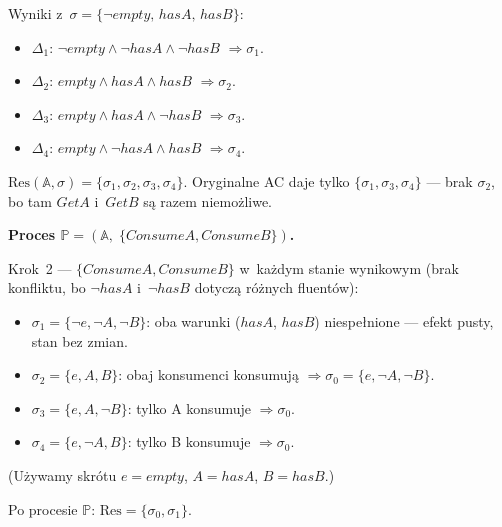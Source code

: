 \documentclass[11pt,a4paper]{article}
\newif\ifshowbib
\newcommand{\bibonly}[1]{\ifshowbib#1\fi}
\renewcommand{\cite}[2][]{\unskip}%
\theoremstyle{definition}
\begin{document}
\noindent Wyniki z~$\sigma = \{\neg\mathit{empty},\, \mathit{hasA},\, \mathit{hasB}\}$:
\begin{itemize}
  \item $\Delta_1$: $\neg\mathit{empty} \land \neg\mathit{hasA} \land \neg\mathit{hasB}$
        $\Rightarrow \sigma_1$.
  \item $\Delta_2$: $\mathit{empty} \land \mathit{hasA} \land \mathit{hasB}$
        $\Rightarrow \sigma_2$.
  \item $\Delta_3$: $\mathit{empty} \land \mathit{hasA} \land \neg\mathit{hasB}$
        $\Rightarrow \sigma_3$.
  \item $\Delta_4$: $\mathit{empty} \land \neg\mathit{hasA} \land \mathit{hasB}$
        $\Rightarrow \sigma_4$.
\end{itemize}

$\mathrm{Res}(\mathbb{A}, \sigma) = \{\sigma_1, \sigma_2, \sigma_3, \sigma_4\}$.
Oryginalne AC\bibonly{~\cite{rw05}} daje tylko $\{\sigma_1, \sigma_3, \sigma_4\}$ --- brak $\sigma_2$,
bo tam $\mathit{GetA}$ i~$\mathit{GetB}$ są razem niemożliwe.

\medskip
\noindent\textbf{Proces $\mathbb{P} = (\mathbb{A},\; \{\mathit{ConsumeA}, \mathit{ConsumeB}\})$.}

Krok~2 --- $\{\mathit{ConsumeA}, \mathit{ConsumeB}\}$ w~każdym stanie
wynikowym (brak konfliktu, bo $\neg\mathit{hasA}$ i~$\neg\mathit{hasB}$
dotyczą różnych fluentów):
\begin{itemize}
  \item $\sigma_1 = \{\neg e, \neg A, \neg B\}$:
        oba warunki ($\mathit{hasA}$, $\mathit{hasB}$) niespełnione
        --- efekt pusty, stan bez zmian.
  \item $\sigma_2 = \{e, A, B\}$: obaj konsumenci konsumują
        $\Rightarrow \sigma_0 = \{e, \neg A, \neg B\}$.
  \item $\sigma_3 = \{e, A, \neg B\}$: tylko A konsumuje
        $\Rightarrow \sigma_0$.
  \item $\sigma_4 = \{e, \neg A, B\}$: tylko B konsumuje
        $\Rightarrow \sigma_0$.
\end{itemize}

(Używamy skrótu $e = \mathit{empty}$, $A = \mathit{hasA}$, $B = \mathit{hasB}$.)

Po procesie $\mathbb{P}$: $\mathrm{Res} = \{\sigma_0, \sigma_1\}$.
\end{document}
